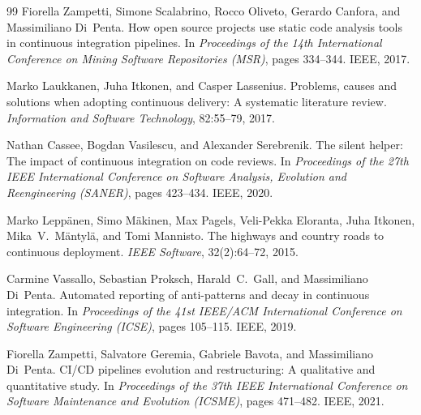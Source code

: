 \documentclass[a4paper,11pt]{article}
\begin{document}
\begin{thebibliography}{99}
Fiorella Zampetti, Simone Scalabrino, Rocco Oliveto, Gerardo Canfora, and Massimiliano Di~Penta.
\newblock How open source projects use static code analysis tools in continuous integration pipelines.
\newblock In \emph{Proceedings of the 14th International Conference on Mining Software Repositories (MSR)}, pages 334--344. IEEE, 2017.

Marko Laukkanen, Juha Itkonen, and Casper Lassenius.
\newblock Problems, causes and solutions when adopting continuous delivery: A systematic literature review.
\newblock \emph{Information and Software Technology}, 82:55--79, 2017.

Nathan Cassee, Bogdan Vasilescu, and Alexander Serebrenik.
\newblock The silent helper: The impact of continuous integration on code reviews.
\newblock In \emph{Proceedings of the 27th IEEE International Conference on Software Analysis, Evolution and Reengineering (SANER)}, pages 423--434. IEEE, 2020.

Marko Lepp\"{a}nen, Simo M\"{a}kinen, Max Pagels, Veli-Pekka Eloranta, Juha Itkonen, Mika~V.\ M\"{a}ntyl\"{a}, and Tomi Mannisto.
\newblock The highways and country roads to continuous deployment.
\newblock \emph{IEEE Software}, 32(2):64--72, 2015.

Carmine Vassallo, Sebastian Proksch, Harald~C.\ Gall, and Massimiliano Di~Penta.
\newblock Automated reporting of anti-patterns and decay in continuous integration.
\newblock In \emph{Proceedings of the 41st IEEE/ACM International Conference on Software Engineering (ICSE)}, pages 105--115. IEEE, 2019.

Fiorella Zampetti, Salvatore Geremia, Gabriele Bavota, and Massimiliano Di~Penta.
\newblock CI/CD pipelines evolution and restructuring: A qualitative and quantitative study.
\newblock In \emph{Proceedings of the 37th IEEE International Conference on Software Maintenance and Evolution (ICSME)}, pages 471--482. IEEE, 2021.

\end{thebibliography}
\end{document}
